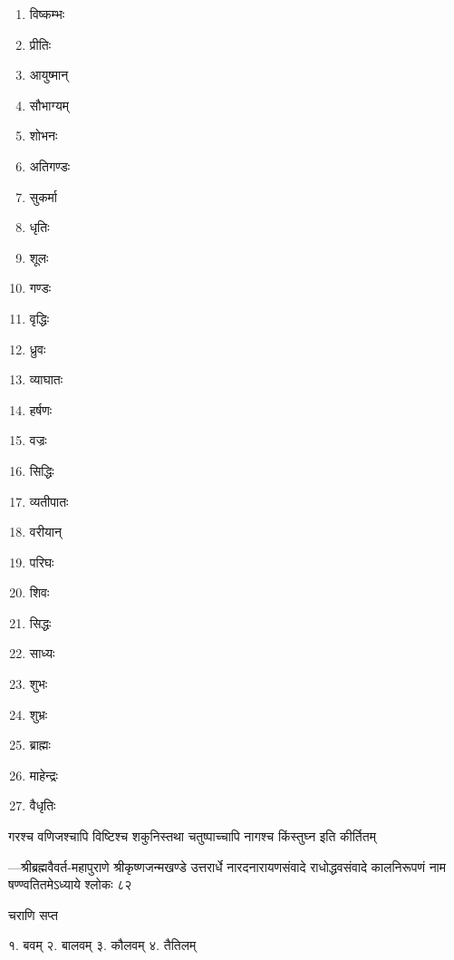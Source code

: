 \begin{multicols}{3}
  \begin{enumerate}\itemsep-1ex
    
    \item विष्कम्भः
    \item प्रीतिः
    \item आयुष्मान्
    \item सौभाग्यम्
    \item शोभनः
    \item अतिगण्डः
    \item सुकर्मा
    \item धृतिः
    \item शूलः
    \item गण्डः
    \item वृद्धिः
    \item ध्रुवः
    \item व्याघातः
    \item हर्षणः
    \item वज्रः
    \item सिद्धिः
    \item व्यतीपातः
    \item वरीयान्
    \item परिघः
    \item शिवः
    \item सिद्धः
    \item साध्यः
    \item शुभः
    \item शुभ्रः
    \item ब्राह्मः
    \item माहेन्द्रः
    \item वैधृतिः
    
  \end{enumerate}
\end{multicols}


{गरश्च वणिजश्चापि विष्टिश्च शकुनिस्तथा}
{चतुष्पाच्चापि नागश्च किंस्तुघ्न इति कीर्तितम्}

{\fontsize{10}{4}\selectfont ---श्रीब्रह्मवैवर्त-महापुराणे श्रीकृष्णजन्मखण्डे उत्तरार्धे नारदनारायणसंवादे राधोद्धवसंवादे कालनिरूपणं नाम षण्ण्वतितमेऽध्याये श्लोकः ८२}


{चराणि सप्त}

१. बवम् \hspace{2ex} २. बालवम् \hspace{2ex} ३. कौलवम् \hspace{2ex} ४. तैतिलम्

